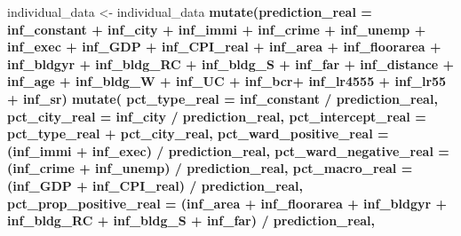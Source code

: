 \documentclass[
]{article}
\newenvironment{Shaded}{\begin{snugshade}}{\end{snugshade}}
\newcommand{\DataTypeTok}[1]{\textcolor[rgb]{0.13,0.29,0.53}{#1}}
\newcommand{\KeywordTok}[1]{\textcolor[rgb]{0.13,0.29,0.53}{\textbf{#1}}}
\newcommand{\NormalTok}[1]{#1}
\newcommand{\OperatorTok}[1]{\textcolor[rgb]{0.81,0.36,0.00}{\textbf{#1}}}
\newcommand{\StringTok}[1]{\textcolor[rgb]{0.31,0.60,0.02}{#1}}
\begin{document}
\begin{Shaded}
\begin{Highlighting}[]
{\NormalTok{individual_data <-}\StringTok{ }\NormalTok{individual_data }\OperatorTok{%
\StringTok{  }\KeywordTok{mutate}\NormalTok{(}\DataTypeTok{prediction_real =}\NormalTok{ inf_constant }\OperatorTok{+}\StringTok{ }\NormalTok{inf_city }\OperatorTok{+}\StringTok{ }
\StringTok{           }\NormalTok{inf_immi }\OperatorTok{+}\StringTok{ }\NormalTok{inf_crime }\OperatorTok{+}\StringTok{ }\NormalTok{inf_unemp }\OperatorTok{+}\StringTok{ }\NormalTok{inf_exec }\OperatorTok{+}
\StringTok{           }\NormalTok{inf_GDP }\OperatorTok{+}\StringTok{ }\NormalTok{inf_CPI_real }\OperatorTok{+}\StringTok{ }
\StringTok{          }\NormalTok{inf_area }\OperatorTok{+}\StringTok{ }\NormalTok{inf_floorarea }\OperatorTok{+}\StringTok{ }
\StringTok{           }\NormalTok{inf_bldgyr }\OperatorTok{+}\StringTok{ }\NormalTok{inf_bldg_RC }\OperatorTok{+}\StringTok{ }\NormalTok{inf_bldg_S }\OperatorTok{+}\StringTok{ }\NormalTok{inf_far }\OperatorTok{+}
\StringTok{           }\NormalTok{inf_distance }\OperatorTok{+}\StringTok{ }\NormalTok{inf_age }\OperatorTok{+}\StringTok{ }
\StringTok{           }\NormalTok{inf_bldg_W }\OperatorTok{+}\StringTok{ }\NormalTok{inf_UC }\OperatorTok{+}\StringTok{ }\NormalTok{inf_bcr}\OperatorTok{+}
\StringTok{           }\NormalTok{inf_lr4555 }\OperatorTok{+}\StringTok{ }\NormalTok{inf_lr55 }\OperatorTok{+}\StringTok{ }\NormalTok{inf_sr) }\OperatorTok{%
\StringTok{  }\KeywordTok{mutate}\NormalTok{(}
    \DataTypeTok{pct_type_real =}\NormalTok{ inf_constant }\OperatorTok{/}\StringTok{ }\NormalTok{prediction_real,}
    \DataTypeTok{pct_city_real =}\NormalTok{ inf_city }\OperatorTok{/}\StringTok{ }\NormalTok{prediction_real,}
    \DataTypeTok{pct_intercept_real =}\NormalTok{ pct_type_real }\OperatorTok{+}\StringTok{ }\NormalTok{pct_city_real,}
    \DataTypeTok{pct_ward_positive_real =}\NormalTok{ (inf_immi }\OperatorTok{+}\StringTok{ }\NormalTok{inf_exec) }\OperatorTok{/}\StringTok{ }\NormalTok{prediction_real,}
    \DataTypeTok{pct_ward_negative_real =}\NormalTok{ (inf_crime }\OperatorTok{+}\StringTok{ }\NormalTok{inf_unemp) }\OperatorTok{/}\StringTok{ }\NormalTok{prediction_real,}
    \DataTypeTok{pct_macro_real =}\NormalTok{ (inf_GDP }\OperatorTok{+}\StringTok{ }\NormalTok{inf_CPI_real) }\OperatorTok{/}\StringTok{ }\NormalTok{prediction_real,}
    \DataTypeTok{pct_prop_positive_real =}
\NormalTok{      (inf_area }\OperatorTok{+}\StringTok{ }\NormalTok{inf_floorarea }\OperatorTok{+}\StringTok{ }
\StringTok{         }\NormalTok{inf_bldgyr }\OperatorTok{+}\StringTok{ }\NormalTok{inf_bldg_RC }\OperatorTok{+}\StringTok{ }\NormalTok{inf_bldg_S }\OperatorTok{+}\StringTok{ }\NormalTok{inf_far) }\OperatorTok{/}\StringTok{ }\NormalTok{prediction_real,}
}}}
\end{Highlighting}
\end{Shaded}
\end{document}
